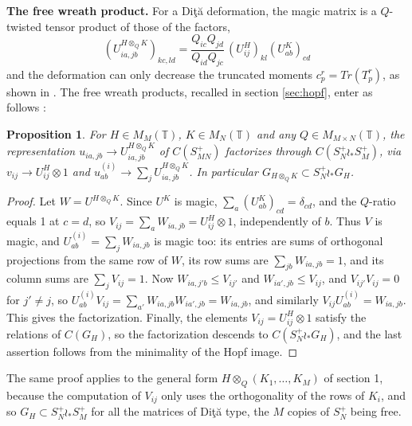 \documentclass[11pt]{amsart}
\newtheorem{proposition}[theorem]{Proposition}
\newcommand{\T}{\mathbb T}
\begin{document}
\medskip

\noindent\textbf{The free wreath product.} For a Di\c t\u a deformation, the magic matrix is a $Q$-twisted tensor product of those of the factors,
$$(U^{H\otimes_QK}_{ia,jb})_{kc,ld}=\frac{Q_{ic}Q_{jd}}{Q_{id}Q_{jc}}\,(U^H_{ij})_{kl}(U^K_{ab})_{cd}$$
and the deformation can only decrease the truncated moments $c_p^r=Tr(T_p^r)$, as shown in \cite[Theorem 2.8]{bb3}. The free wreath products, recalled in section \ref{sec:hopf}, enter as follows \cite{bi0,bb3}:

\begin{proposition}\label{prop:wreath}
For $H\in M_M(\T)$, $K\in M_N(\T)$ and any $Q\in M_{M\times N}(\T)$, the representation $u_{ia,jb}\to U^{H\otimes_QK}_{ia,jb}$ of $C(S_{MN}^+)$ factorizes through $C(S_N^+\wr_*S_M^+)$, via $v_{ij}\to U^H_{ij}\otimes1$ and $u^{(i)}_{ab}\to\sum_jU^{H\otimes_QK}_{ia,jb}$. In particular $G_{H\otimes_QK}\subset S_N^+\wr_*G_H$.
\end{proposition}

\begin{proof}
Let $W=U^{H\otimes_QK}$. Since $U^K$ is magic, $\sum_a(U^K_{ab})_{cd}=\delta_{cd}$, and the $Q$-ratio equals 1 at $c=d$, so $V_{ij}=\sum_aW_{ia,jb}=U^H_{ij}\otimes1$, independently of $b$. Thus $V$ is magic, and $U^{(i)}_{ab}=\sum_jW_{ia,jb}$ is magic too: its entries are sums of orthogonal projections from the same row of $W$, its row sums are $\sum_{jb}W_{ia,jb}=1$, and its column sums are $\sum_jV_{ij}=1$. Now $W_{ia,j'b}\leq V_{ij'}$ and $W_{ia',jb}\leq V_{ij}$, and $V_{ij'}V_{ij}=0$ for $j'\neq j$, so $U^{(i)}_{ab}V_{ij}=\sum_{a'}W_{ia,jb}W_{ia',jb}=W_{ia,jb}$, and similarly $V_{ij}U^{(i)}_{ab}=W_{ia,jb}$. This gives the factorization. Finally, the elements $V_{ij}=U^H_{ij}\otimes1$ satisfy the relations of $C(G_H)$, so the factorization descends to $C(S_N^+\wr_*G_H)$, and the last assertion follows from the minimality of the Hopf image.
\end{proof}

The same proof applies to the general form $H\otimes_Q(K_1,\ldots,K_M)$ of section 1, because the computation of $V_{ij}$ only uses the orthogonality of the rows of $K_i$, and so $G_H\subset S_N^+\wr_*S_M^+$ for all the matrices of Di\c t\u a type, the $M$ copies of $S_N^+$ being free.
\end{document}
